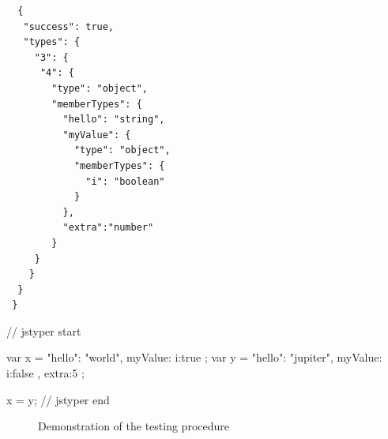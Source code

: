 \documentclass[12pt,a4paper,twoside,openright]{report}
\theoremstyle{definition}
\theoremstyle{dotless}
\begin{document}
\newsavebox{\testbox}
\begin{lrbox}{\testbox}
  \begin{minipage}[c]{75mm}
  	\begin{verbatim}
  {
   "success": true,
   "types": {
     "3": {
      "4": {
        "type": "object",
        "memberTypes": {
          "hello": "string",
          "myValue": {
            "type": "object",
            "memberTypes": {
              "i": "boolean"
            }
          },
          "extra":"number"
        }
     }
    }
  }
 }
	\end{verbatim}
  \end{minipage}
\end{lrbox}

\begin{lrbox}{}
  \begin{minipage}[c][111mm]{75mm}
  	\begin{jscript}
	  // jstyper start

	  var x = {
  		"hello": "world",
  		myValue: {
    	  i:true
  		}
	  };
	  var y = {
  		"hello": "jupiter",
  		myValue: {
    	  i:false  
  		},
  		extra:5
	  };

	  x = y;
	  // jstyper end


  	\end{jscript}
  \end{minipage}
\end{lrbox}
\begin{figure}
  \centering

  \caption[Demonstration of the testing procedure]{Demonstration of the testing procedure}
  \label{fig:jasmine}
\end{figure}
\end{document}
